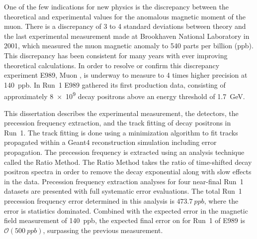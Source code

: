


One of the few indications for new physics is the discrepancy between the theoretical and experimental values for the anomalous magnetic moment of the muon. There is a discrepancy of 3 to 4 standard deviations between theory and the last experimental measurement made at Brookhaven National Laboratory in 2001, which measured the muon magnetic anomaly \amu to 540 parts per billion (ppb). This discrepancy has been consistent for many years with ever improving theoretical calculations. In order to resolve or confirm this discrepancy experiment E989, Muon \gmtwo, is underway to measure \amu to 4 times higher precision at \SI{140}{ppb}. In Run~1 E989 gathered its first production data, consisting of approximately \SI{8e9}{} decay positrons above an energy threshold of \SI{1.7}{\GeV}.

This dissertation describes the experimental measurement, the detectors, the precession frequency extraction, and the track fitting of decay positrons in Run~1. The track fitting is done using a \chisq minimization algorithm to fit tracks propagated within a Geant4 reconstruction simulation including error propagation. The precession frequency is extracted using an analysis technique called the Ratio Method. The Ratio Method takes the ratio of time-shifted decay positron spectra in order to remove the decay exponential along with slow effects in the data. Precession frequency extraction analyses for four near-final Run~1 datasets are presented with full systematic error evaluations. The total Run~1 precession frequency error determined in this analysis is $\SI{473.7}{ppb}$, where the error is statistics dominated. Combined with the expected error in the magnetic field measurement of \SI{140}{ppb}, the expected final error on \amu for Run~1 of E989 is $\mathcal{O}(\SI{500}{ppb})$, surpassing the previous measurement.






